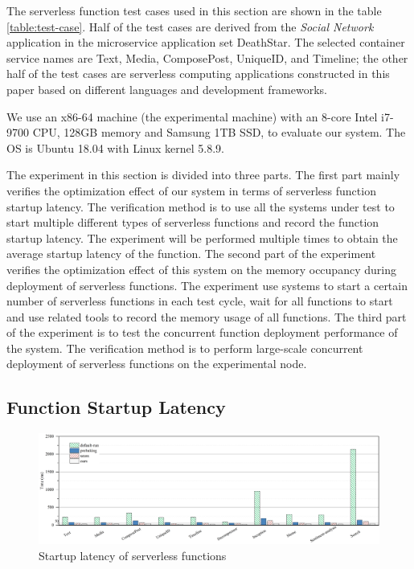 The serverless function test cases used in this section are shown in the table \ref{table:test-case}. 
Half of the test cases are derived from the \textit{Social Network} application in the 
microservice application set DeathStar\cite{deathstar}. 
The selected container service names are Text, Media, ComposePost, UniqueID, and Timeline; 
the other half of the test cases are serverless 
computing applications constructed in this paper based on different languages and development frameworks.

We use an x86-64 machine (the experimental machine) with 
an 8-core Intel i7-9700 CPU, 128GB memory and Samsung
1TB SSD, to evaluate our system. 
The OS is Ubuntu 18.04 with Linux kernel 5.8.9.

The experiment in this section is divided into three parts. 
The first part mainly verifies the optimization 
effect of our system in terms of serverless function startup latency. 
The verification method is to use all the systems under test 
to start multiple different types of serverless functions and record the function startup latency. 
The experiment will be performed multiple times to obtain the average startup latency of the function.
The second part of the experiment verifies the optimization effect of this system on the memory occupancy during deployment of serverless functions. 
The experiment use systems to start a certain number of serverless functions in each test cycle, 
wait for all functions to start and use related tools to record the memory usage of all functions. 
The third part of the experiment is to test 
the concurrent function deployment performance of the system. 
The verification method is to perform large-scale 
concurrent deployment of serverless functions on the experimental node.

\subsection{Function Startup Latency}

\begin{figure}[t]
    \centering
    \includegraphics[width=\linewidth]{images/startup-latency.png}
    \caption{Startup latency of serverless functions}
    \label{startup-latency}
\end{figure}

